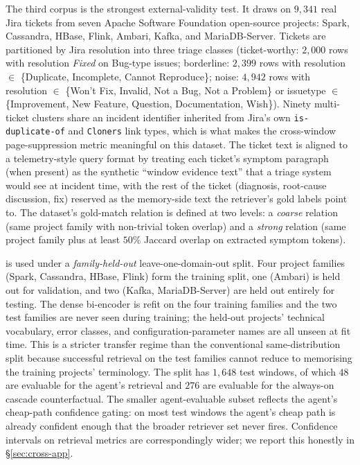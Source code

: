 The third corpus is the strongest external-validity test. It draws on $9{,}341$ real Jira tickets from seven Apache Software Foundation open-source projects: Spark, Cassandra, HBase, Flink, Ambari, Kafka, and MariaDB-Server. Tickets are partitioned by Jira resolution into three triage classes (ticket-worthy: $2{,}000$ rows with resolution \emph{Fixed} on Bug-type issues; borderline: $2{,}399$ rows with resolution $\in$ \{Duplicate, Incomplete, Cannot Reproduce\}; noise: $4{,}942$ rows with resolution $\in$ \{Won't Fix, Invalid, Not a Bug, Not a Problem\} or issuetype $\in$ \{Improvement, New Feature, Question, Documentation, Wish\}). Ninety multi-ticket clusters share an incident identifier inherited from Jira's own \texttt{is-duplicate-of} and \texttt{Cloners} link types, which is what makes the cross-window page-suppression metric meaningful on this dataset. The ticket text is aligned to a telemetry-style query format by treating each ticket's symptom paragraph (when present) as the synthetic ``window evidence text'' that a triage system would see at incident time, with the rest of the ticket (diagnosis, root-cause discussion, fix) reserved as the memory-side text the retriever's gold labels point to. The dataset's gold-match relation is defined at two levels: a \emph{coarse} relation (same project family with non-trivial token overlap) and a \emph{strong} relation (same project family plus at least $50\%$ Jaccard overlap on extracted symptom tokens).

\dswol{} is used under a \emph{family-held-out} leave-one-domain-out split. Four project families (Spark, Cassandra, HBase, Flink) form the training split, one (Ambari) is held out for validation, and two (Kafka, MariaDB-Server) are held out entirely for testing. The dense bi-encoder is refit on the four training families and the two test families are never seen during training; the held-out projects' technical vocabulary, error classes, and configuration-parameter names are all unseen at fit time. This is a stricter transfer regime than the conventional same-distribution split because successful retrieval on the test families cannot reduce to memorising the training projects' terminology. The split has $1{,}648$ test windows, of which $48$ are evaluable for the agent's retrieval and $276$ are evaluable for the always-on cascade counterfactual. The smaller agent-evaluable subset reflects the agent's cheap-path confidence gating: on most test windows the agent's cheap path is already confident enough that the broader retriever set never fires. Confidence intervals on \dswol{} retrieval metrics are correspondingly wider; we report this honestly in \S\ref{sec:cross-app}.


